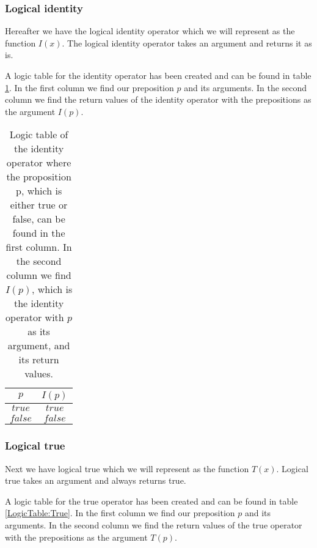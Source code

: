             \subsubsection{Logical identity}
        
                Hereafter we have the logical identity operator which we will represent as the function $I(x)$. The logical identity operator takes an argument and returns it as is. 
                
                A logic table for the identity operator has been created and can be found in table \ref{LogicTable:Identity}. In the first column we find our preposition $p$ and its arguments. In the second column we find the return values of the identity operator with the prepositions as the argument $I(p)$.
                
                \begin{table}[h!]
                    \centering
                    \begin{tabular}{|c|c|}
                    	\hline
                    	  $p$   & $I(p)$  \\ \hline
                    	$true$  & $true$  \\ \hline
                    	$false$ & $false$ \\ \hline
                    \end{tabular}
                    \caption{Logic table of the identity operator where the proposition p, which is either true or false, can be found in the first column. In the second column we find $I(p)$, which is the identity operator with $p$ as its argument, and its return values.}
                    \label{LogicTable:Identity}
                \end{table}
        
            \subsubsection{Logical true}
        
                Next we have logical true which we will represent as the function $T(x)$. Logical true takes an argument and always returns true.
                
                A logic table for the true operator has been created and can be found in table \ref{LogicTable:True}. In the first column we find our preposition $p$ and its arguments. In the second column we find the return values of the true operator with the prepositions as the argument $T(p)$.
                
